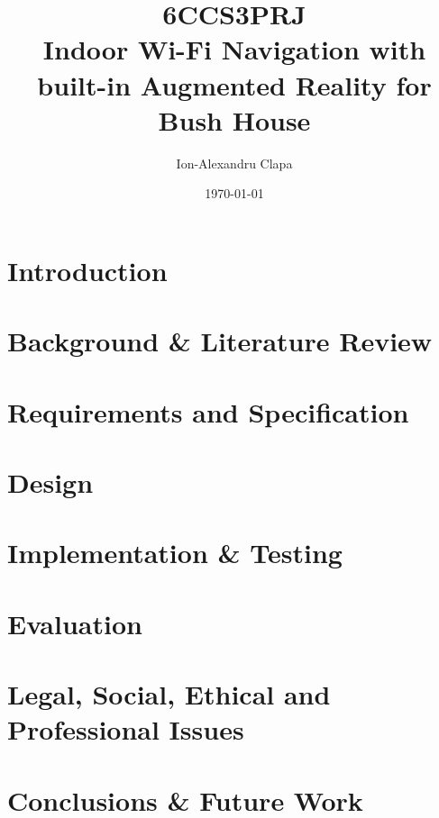 \documentclass[12pt]{informatics-report}
\title{6CCS3PRJ\\\vspace{0.2cm}Indoor Wi-Fi Navigation with built-in Augmented Reality for Bush House}
\author{Ion-Alexandru Clapa}
\date{\today}
\begin{document}
{%
\setlength{\fboxsep}{0pt}%
\setlength{\fboxrule}{1pt}%
}%
\captionsetup{justification=centering,margin=2cm}


\createFrontMatter
\onehalfspacing
\tableofcontents
\doublespacing
\listoffigures
\listoftables

\makenomenclature
\renewcommand{\nomname}{Abbreviations}

\newpage

\onehalfspacing
\chapter{Introduction}

\newpage
\chapter{Background \& Literature Review}

\newpage
\chapter{Requirements and Specification}

\newpage
\chapter{Design}

\newpage
\chapter{Implementation \& Testing}

\newpage
\chapter{Evaluation}

\newpage
\chapter{Legal, Social, Ethical and Professional Issues}

\newpage
\chapter{Conclusions \& Future Work}


\newpage

\printnomenclature

\newpage


\end{document}

